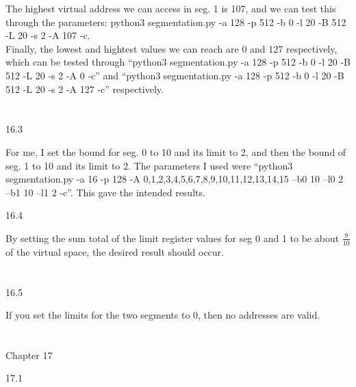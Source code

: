 \documentclass[12pt, a4paper]{article}
\begin{document}
The highest virtual address we can access in seg. 1 is 107, and we can test this through the parameters: python3 segmentation.py -a 128 -p 512 -b 0 -l 20 -B 512 -L 20 -s 2 -A 107 -c.\\

Finally, the lowest and hightest values we can reach are 0 and 127 respectively, which can be tested through ``python3 segmentation.py -a 128 -p 512 -b 0 -l 20 -B 512 -L 20 -s 2 -A 0 -c'' and ``python3 segmentation.py -a 128 -p 512 -b 0 -l 20 -B 512 -L 20 -s 2 -A 127 -c'' respectively.\\ \\ \\


16.3

For me, I set the bound for seg. 0 to 10 and its limit to 2, and then the bound of seg. 1 to 10 and its limit to 2. The parameters I used were ``python3 segmentation.py -a 16 -p 128 -A 0,1,2,3,4,5,6,7,8,9,10,11,12,13,14,15 --b0 10 --l0 2 --b1 10 --l1 2 -c''. This gave the intended results.

16.4

By setting the sum total of the limit register values for seg 0 and 1 to be about \(\frac{9}{10}\) of the virtual space, the desired result should occur. \\ \\ \\

16.5

If you set the limits for the two segments to 0, then no addresses are valid. \\ \\ \\

Chapter 17

17.1
\end{document}
